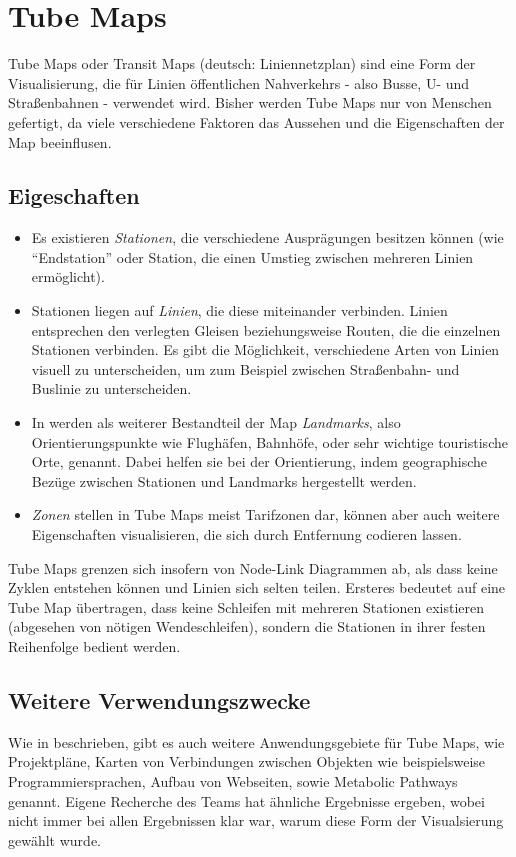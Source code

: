 \documentclass[color,german]{tudbook}
\begin{document}
\section{Tube Maps}
Tube Maps oder Transit Maps (deutsch: Liniennetzplan) sind eine Form der Visualisierung, die für Linien öffentlichen Nahverkehrs - also Busse, U- und Straßenbahnen - verwendet wird. Bisher werden Tube Maps nur von Menschen gefertigt, da viele verschiedene Faktoren das Aussehen und die Eigenschaften der Map beeinflusen.  
\subsection{Eigeschaften}
\begin{itemize}
\item Es existieren \emph{Stationen}, die verschiedene Ausprägungen besitzen können (wie "`Endstation"' oder Station, die einen Umstieg zwischen mehreren Linien ermöglicht). 
\item Stationen liegen auf \emph{Linien}, die diese miteinander verbinden. Linien entsprechen den verlegten Gleisen beziehungsweise Routen, die die einzelnen Stationen verbinden. Es gibt die Möglichkeit, verschiedene Arten von Linien visuell zu unterscheiden, um zum Beispiel zwischen Straßenbahn- und Buslinie zu unterscheiden.
\item In \cite{automaticlayoutmetro08} werden als weiterer Bestandteil der Map \emph{Landmarks}, also Orientierungspunkte wie Flughäfen, Bahnhöfe, oder sehr wichtige touristische Orte, genannt. Dabei helfen sie bei der Orientierung, indem geographische Bezüge zwischen Stationen und Landmarks hergestellt werden.
\item \emph{Zonen} stellen in Tube Maps meist Tarifzonen dar, können aber auch weitere Eigenschaften visualisieren, die sich durch Entfernung codieren lassen. 
\end{itemize}
Tube Maps grenzen sich insofern von Node-Link Diagrammen ab, als dass keine Zyklen entstehen können und Linien sich selten teilen. Ersteres bedeutet auf eine Tube Map übertragen, dass keine Schleifen mit mehreren Stationen existieren (abgesehen von nötigen Wendeschleifen), sondern die Stationen in ihrer festen Reihenfolge bedient werden. 

\subsection{Weitere Verwendungszwecke}
\label{tm:verwendungszwecke}
Wie in \cite{automaticlayoutmetro08} beschrieben, gibt es auch weitere Anwendungsgebiete für Tube Maps, wie Projektpläne, Karten von Verbindungen zwischen Objekten wie beispielsweise Programmiersprachen, Aufbau von Webseiten, sowie Metabolic Pathways genannt. Eigene Recherche des Teams hat ähnliche Ergebnisse ergeben, wobei nicht immer bei allen Ergebnissen klar war, warum diese Form der Visualsierung gewählt wurde. 
\end{document}
